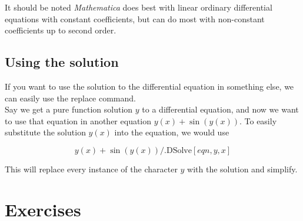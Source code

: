 \documentclass[11pt,letterpaper,twoside,titlepage]{report}
\newcommand{\Mathematica}{\textit{Mathematica} }
\begin{document}
			It should be noted \Mathematica does best with linear ordinary differential equations with constant coefficients, but can do most with non-constant coefficients up to second order.
			
			\section{Using the solution}
			
				If you want to use the solution to the differential equation in something else, we can easily use the replace command. \\
				
				Say we get a pure function solution $y$ to a differential equation, and now we want to use that equation in another equation $y(x) + \sin(y(x))$.  To easily substitute the solution $y(x)$ into the equation, we would use
				
				\[ y(x) + \sin(y(x)) /. \text{DSolve}[eqn,y,x] \]
				
				This will replace every instance of the character $y$ with the solution and simplify.
				
		\chapter{Exercises}
		
\end{document}
